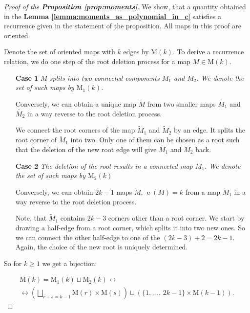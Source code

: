 \documentclass{article}
\begin{document}
\begin{proof}[Proof of the \textbf{Proposition \ref{prop:moments}}]
    We show, that a quantity obtained in the \textbf{Lemma \ref{lemma:moments_as_polynomial_in_c}} satisfies a recurrence given in the statement of the proposition. All maps in this proof are oriented.
    
    Denote the set of oriented maps with $k$ edges by $\mathrm{M}(k)$. To derive a recurrence relation, we do one step of the root deletion process for a map $M \in \mathrm{M}(k)$.
    
    \begin{itemize}
    	\item[\textbf{Case 1}] \emph{$M$ splits into two connected components $M_1$ and $M_2$. We denote the set of such maps by $\mathrm{M}_{1}(k)$.}
    	
    	Conversely, we can obtain a unique map $\tilde{M}$ from two smaller maps $\tilde{M}_1$ and $\tilde{M_2}$ in a way reverse to the root deletion process.
    	
    	We connect the root corners of the map $\tilde{M}_1$ and $\tilde{M}_2$ by an edge. It splits the root corner of $\tilde{M}_1$ into two. Only one of them can be chosen as a root such that the deletion of the new root edge will give $M_1$ and $M_2$ back.
    	
    	\item[\textbf{Case 2}] \emph{The deletion of the root results in a connected map $M_1$. We denote the set of such maps by $\mathrm{M}_2(k)$}
    	
    	Conversely, we can obtain $2k - 1$ maps $\tilde{M}, \, \mathop{e}(M) = k$ from a map $\tilde{M}_1$ in a way reverse to the root deletion process.
    	
    	Note, that $\tilde{M}_1$ contains $2k - 3$ corners other than a root corner. We start by drawing a half-edge from a root corner, which splits it into two new ones. So we can connect the other half-edge to one of the $(2k - 3) + 2 = 2k - 1$. Again, the choice of the new root is uniquely determined. 
    \end{itemize}

	
    
	So for $k \geq 1$ we get a bijection:
    
    \begin{multline}\label{eq:oriented_maps_decomposition}
        \mathrm{M}(k) = \mathrm{M}_1(k) \sqcup \mathrm{M}_2(k) \longleftrightarrow \\ 
        \longleftrightarrow\left(\bigsqcup_{r + s = k - 1}\mathrm{M}(r)\times \mathrm{M}(s)\right) \sqcup \left(\{1,\,  \ldots,\, 2k - 1\} \times \mathrm{M}(k - 1)\right).
    \end{multline}


\end{proof}
\end{document}

